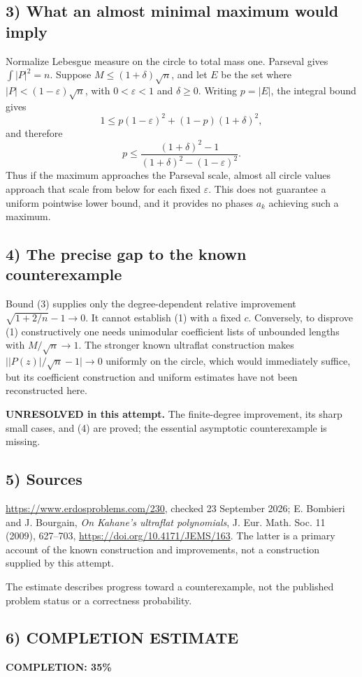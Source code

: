 \subsection*{3) What an almost minimal maximum would imply}
Normalize Lebesgue measure on the circle to total mass one. Parseval gives $\int|P|^2=n$. Suppose $M\le(1+\delta)\sqrt n$, and let $E$ be the set where $|P|<(1-\varepsilon)\sqrt n$, with $0<\varepsilon<1$ and $\delta\ge0$. Writing $p=|E|$, the integral bound gives
\[
 1\le p(1-\varepsilon)^2+(1-p)(1+\delta)^2,
\]
and therefore
\[
 p\le
 \frac{(1+\delta)^2-1}{(1+\delta)^2-(1-\varepsilon)^2}.\tag{4}
\]
Thus if the maximum approaches the Parseval scale, almost all circle values approach that scale from below for each fixed $\varepsilon$. This does not guarantee a uniform pointwise lower bound, and it provides no phases $a_k$ achieving such a maximum.

\subsection*{4) The precise gap to the known counterexample}
Bound (3) supplies only the degree-dependent relative improvement $\sqrt{1+2/n}-1\to0$. It cannot establish (1) with a fixed $c$. Conversely, to disprove (1) constructively one needs unimodular coefficient lists of unbounded lengths with $M/\sqrt n\to1$. The stronger known ultraflat construction makes $\bigl||P(z)|/\sqrt n-1\bigr|\to0$ uniformly on the circle, which would immediately suffice, but its coefficient construction and uniform estimates have not been reconstructed here.

\textbf{UNRESOLVED in this attempt.} The finite-degree improvement, its sharp small cases, and (4) are proved; the essential asymptotic counterexample is missing.

\subsection*{5) Sources}
\url{https://www.erdosproblems.com/230}, checked 23 September 2026; E. Bombieri and J. Bourgain, \emph{On Kahane's ultraflat polynomials}, J. Eur. Math. Soc. 11 (2009), 627--703, \url{https://doi.org/10.4171/JEMS/163}. The latter is a primary account of the known construction and improvements, not a construction supplied by this attempt.

The estimate describes progress toward a counterexample, not the published problem status or a correctness probability.
\subsection*{6) COMPLETION ESTIMATE}
\textbf{COMPLETION: 35\%}
